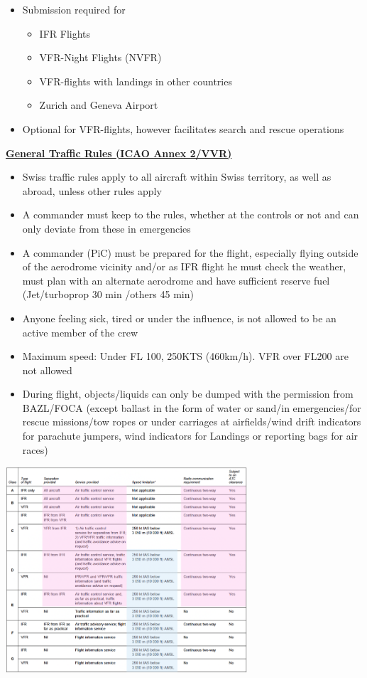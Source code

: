 \documentclass[9pt, landscape, fleqn]{scrartcl}
\begin{document}
\begin{multicols*}{3}
\begin{itemize}
    \item Submission required for 
    \begin{itemize}
        \item IFR Flights 
        \item VFR-Night Flights (NVFR)
        \item VFR-flights with landings in other countries 
        \item Zurich and Geneva Airport 
    \end{itemize}
    \item Optional for VFR-flights, however facilitates search and rescue operations 
\end{itemize}
\underline{\textbf{General Traffic Rules (ICAO Annex 2/VVR)}}
\begin{itemize}
    \item Swiss traffic rules apply to all aircraft within Swiss territory, as well as abroad, unless other rules apply
    \item A commander must keep to the rules, whether at the controls or not and can only deviate from these in emergencies 
    \item A commander (PiC) must be prepared for the flight, especially flying outside of the aerodrome vicinity and/or as IFR flight he must check the weather, must plan with an alternate aerodrome and have sufficient reserve fuel (Jet/turboprop 30 min /others 45 min)
    \item Anyone feeling sick, tired or under the influence, is not allowed to be an active member of the crew 
    \item Maximum speed: Under FL 100, 250KTS (460km/h). VFR over FL200 are not allowed 
    \item During flight, objects/liquids can only be dumped with the permission from BAZL/FOCA (except ballast in the form of water or sand/in emergencies/for rescue missions/tow ropes or under carriages at airfields/wind drift indicators for parachute jumpers, wind indicators for Landings or reporting bags for air races)
\end{itemize}
\begin{center}
    \includegraphics[width=9cm]{Images/Airspace controlled-uncontrolled.png}

\end{center}
\end{multicols*}
\end{document}
